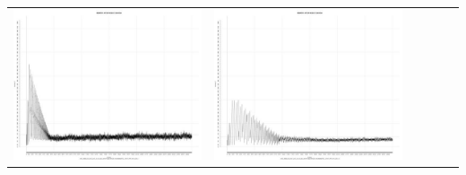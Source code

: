 \begin{table}[htbp]
{\begin{tabular}{l | ccccc}
\begin{minipage}{.15\textwidth}
     			 	\includegraphics[width=\linewidth]{images/mema-triple/I3}
    				 \end{minipage}
    			   & \begin{minipage}{.15\textwidth}
     			 	\includegraphics[width=\linewidth]{images/mema-triple/I7}
    				 \end{minipage}
    			   &	 \begin{minipage}{.15\textwidth}

\end{minipage}
\end{tabular}}
\end{table}

